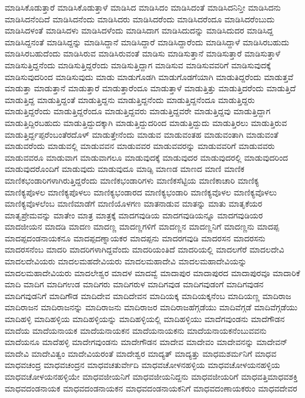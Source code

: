 {ಮಾಡಿಸಿಕೊಡುತ್ತಾರೆ
ಮಾಡಿಸಿಕೊಡುತ್ತಾಳೆ
ಮಾಡಿಸಿದ
ಮಾಡಿಸಿದಂ
ಮಾಡಿಸಿದಂತೆ
ಮಾಡಿಸಿದನಿನ್ತೀ
ಮಾಡಿಸಿದನು
ಮಾಡಿಸಿದನೆಂದಿದೆ
ಮಾಡಿಸಿದನೆಂದು
ಮಾಡಿಸಿದರು
ಮಾಡಿಸಿದರೆಂದು
ಮಾಡಿಸಿದರೆಂದೂ
ಮಾಡಿಸಿದರೆಂಬುದು
ಮಾಡಿಸಿದಳಂತೆ
ಮಾಡಿಸಿದಳು
ಮಾಡಿಸಿದಳೆಂದು
ಮಾಡಿಸಿದಾಗ
ಮಾಡಿಸಿದುದನ್ನು
ಮಾಡಿಸಿದುದರ
ಮಾಡಿಸಿದ್ದ
ಮಾಡಿಸಿದ್ದನಂತೆ
ಮಾಡಿಸಿದ್ದನ್ನು
ಮಾಡಿಸಿದ್ದಾನೆ
ಮಾಡಿಸಿದ್ದಾರೆ
ಮಾಡಿಸಿದ್ದಾರೆಂದು
ಮಾಡಿಸಿದ್ದಾಳೆ
ಮಾಡಿಸಿರಬಹುದು
ಮಾಡಿಸಿರಬಹುದೆಂದು
ಮಾಡಿಸಿರುವ
ಮಾಡಿಸಿರುವಂತೆ
ಮಾಡಿಸು
ಮಾಡಿಸುತ್ತಾನೆ
ಮಾಡಿಸುತ್ತಾರೆ
ಮಾಡಿಸುತ್ತಾಳೆ
ಮಾಡಿಸುತ್ತಿದ್ದನೆಂದು
ಮಾಡಿಸುತ್ತಿದ್ದರೆಂದು
ಮಾಡಿಸುತ್ತಿದ್ದಾಗ
ಮಾಡಿಸುವ
ಮಾಡಿಸುವವರಿಗೆ
ಮಾಡಿಸುವುದಕ್ಕೆ
ಮಾಡಿಸುವುದರಿಂದ
ಮಾಡಿಸುವುದು
ಮಾಡು
ಮಾಡುಗೊಡಗಿ
ಮಾಡುಗೊಡಗೆಯಾಗಿ
ಮಾಡುತಿದ್ದರೆಂದು
ಮಾಡುತ್ತವೆ
ಮಾಡುತ್ತಾ
ಮಾಡುತ್ತಾನೆ
ಮಾಡುತ್ತಾರೆ
ಮಾಡುತ್ತಾರೆಂದೂ
ಮಾಡುತ್ತಾಳೆ
ಮಾಡುತ್ತಿತ್ತು
ಮಾಡುತ್ತಿದರೆಂದು
ಮಾಡುತ್ತಿದೆ
ಮಾಡುತ್ತಿದ್ದ
ಮಾಡುತ್ತಿದ್ದಂತೆ
ಮಾಡುತ್ತಿದ್ದನು
ಮಾಡುತ್ತಿದ್ದನೆಂದು
ಮಾಡುತ್ತಿದ್ದನೆಂದೂ
ಮಾಡುತ್ತಿದ್ದರು
ಮಾಡುತ್ತಿದ್ದರೆಂದು
ಮಾಡುತ್ತಿದ್ದರೆಂದೂ
ಮಾಡುತ್ತಿದ್ದವರು
ಮಾಡುತ್ತಿದ್ದವರೇ
ಮಾಡುತ್ತಿದ್ದವು
ಮಾಡುತ್ತಿದ್ದಾಗ
ಮಾಡುತ್ತಿದ್ದಿರಬಹುದು
ಮಾಡುತ್ತಿದ್ದುದಕ್ಕಾಗಿ
ಮಾಡುತ್ತಿದ್ದುದರಿಂದ
ಮಾಡುತ್ತಿದ್ದುದು
ಮಾಡುತ್ತಿರಲು
ಮಾಡುತ್ತಿರುವ
ಮಾಡುತ್ತಿರ್ದ್ದಪ್ಪರೆಂಬಂತೆರದೊಳ್
ಮಾಡುತ್ತೇನೆಂದು
ಮಾಡುವ
ಮಾಡುವಂತಹ
ಮಾಡುವಂತಾಗಿ
ಮಾಡುವಂತೆ
ಮಾಡುವರೆಂದು
ಮಾಡುವಲ್ಲಿ
ಮಾಡುವವನ
ಮಾಡುವವರ
ಮಾಡುವವರನ್ನು
ಮಾಡುವವರಿಗೆ
ಮಾಡುವವರು
ಮಾಡುವವರೂ
ಮಾಡುವಾಗ
ಮಾಡುವಾಗಲೂ
ಮಾಡುವುದಕ್ಕೆ
ಮಾಡುವುದರ
ಮಾಡುವುದರಲ್ಲಿ
ಮಾಡುವುದರಿಂದ
ಮಾಡುವುದರೊಂದಿಗೆ
ಮಾಡುವುದು
ಮಾಡುವುದೂ
ಮಾಡ್ಸಿ
ಮಾಣಡ
ಮಾಣದ
ಮಾಣಿ
ಮಾಣಿಕ
ಮಾಣಿಕಭಂಡಾರಿಗಳಾಗಿರುತ್ತಿದ್ದರೆಂದು
ಮಾಣಿಕಭಂಡಾರಿಗಳು
ಮಾಣಿಕಸೆಟ್ಟಿಯ
ಮಾಣಿಕಾಚಾರಿ
ಮಾಣಿಕ್ಯ
ಮಾಣಿಕ್ಯಪೊಳಲ
ಮಾಣಿಕ್ಯಪೊಳಲು
ಮಾಣಿಕ್ಯಭಂಡಾರದ
ಮಾಣಿಕ್ಯಭಂಡಾರಿ
ಮಾಣಿಕ್ಯವೊಳಲ
ಮಾಣಿಕ್ಯವೊಳಲು
ಮಾಣಿಕ್ಯವೊಳಲೆಂಬ
ಮಾಣಿಮಾಡೆಗೆ
ಮಾಣಿಯೊಳಗಣ
ಮಾತನಾಡುವ
ಮಾತನ್ನು
ಮಾತು
ಮಾತೃಕೆಯರ
ಮಾತೃಪ್ರೇಮವನ್ನು
ಮಾತೇಂ
ಮಾತ್ರ
ಮಾತ್ರಕ್ಕೆ
ಮಾದಗವುಡಿಯ
ಮಾದಗವುಡಿಯನ್ನೂ
ಮಾದಗವುಡಿಯರ
ಮಾದಜೀಯನ
ಮಾದಡಿ
ಮಾದಣ
ಮಾದಣ್ಣ
ಮಾದಣ್ಣಗಳಿಗೆ
ಮಾದಣ್ಣನ
ಮಾದಣ್ಣನಿಗೆ
ಮಾದಣ್ಣನು
ಮಾದಪ್ಪ
ಮಾದಪ್ಪದಂಡನಾಯಕನೂ
ಮಾದಪ್ಪದಣ್ನಾಯಕರ
ಮಾದಪ್ಪನು
ಮಾದರಗವುಡಿ
ಮಾದರಸನ
ಮಾದರಸನು
ಮಾದರಸನೆಂಬ
ಮಾದರಿ
ಮಾದರಿಗಳಾಗಿದ್ದವೆಂದು
ಮಾದರಿಯಂತಿದೆ
ಮಾದರಿಯಲ್ಲಿ
ಮಾದಲಗೆರೆ
ಮಾದಲದೇವಿ
ಮಾದಲದೇವಿಯರು
ಮಾದಲಮಹದೇವಿಯರು
ಮಾದಲಮಹಾದೇವಿ
ಮಾದಲಮಹಾದೇವಿಯನ್ನು
ಮಾದಲಮಹಾದೇವಿಯರು
ಮಾದಲೇಶ್ವರ
ಮಾದಳ
ಮಾದವ್ವೆ
ಮಾದಾಪುರ
ಮಾದಾಪುರದ
ಮಾದಾಪುರವೂ
ಮಾದಾರಿಕೆ
ಮಾದಿ
ಮಾದಿಗ
ಮಾದಿಗಉಡ
ಮಾದಿಗರು
ಮಾದಿಗರುಳ
ಮಾದಿಗವುಡ
ಮಾದಿಗವುಡಂಗೆ
ಮಾದಿಗವುಡನ
ಮಾದಿಗವುಡನಿಗೆ
ಮಾದಿಗೌಡ
ಮಾದಿದೇವ
ಮಾದಿದೇವನ
ಮಾದಿಯಕ್ಕ
ಮಾದಿಯಕ್ಕನೆಂಬ
ಮಾದಿಯಣ್ಣ
ಮಾದಿರಾಜ
ಮಾದಿರಾಜನ
ಮಾದಿರಾಜನನ್ನು
ಮಾದಿರಾಜನು
ಮಾದಿರಾಜರ
ಮಾದಿರಾಜಹೆಗ್ಗಡೆಯು
ಮಾದಿವೆಗ್ಗಡೆ
ಮಾದಿವೆಗ್ಗಡೆಯು
ಮಾದಿಹಳ್ಳಿ
ಮಾದಿಹಳ್ಳಿಯ
ಮಾದಿಹಳ್ಳಿಯನ್ನು
ಮಾದಿಹಳ್ಳಿಯಲ್ಲಿ
ಮಾದಿಹಳ್ಳಿಯು
ಮಾದೆಗವುಂಡನು
ಮಾದೆಗೌಡನ
ಮಾದೆಯ
ಮಾದೆಯನಾಯಕ
ಮಾದೆಯನಾಯಕನ
ಮಾದೆಯನಾಯಕನು
ಮಾದೆಯನಾಯಕನೆಂಬುವವನು
ಮಾದೆಯನೂ
ಮಾದೆಹಳ್ಳಿ
ಮಾದೇಗವುಂಡನು
ಮಾದೇಗೌಡನ
ಮಾದೇವ
ಮಾದೇವಂ
ಮಾದೇವನನ್ನು
ಮಾದೇವನ್
ಮಾದೇವಿ
ಮಾದೇವಿತ್ವಂ
ಮಾದೇವಿಯರಂತೆ
ಮಾದೇಶ್ವರ
ಮಾದ್ಯತ್
ಮಾದ್ಯತ್ತು
ಮಾಧಮಶರ್ಮನಿಗೆ
ಮಾಧವ
ಮಾಧವಚಂದ್ರ
ಮಾಧವಚಂದ್ರನ
ಮಾಧವಚತುರ್ವೇದಿ
ಮಾಧವಚೋಳನಹಳ್ಳಿಯ
ಮಾಧವಚೋಳಯನಹಳ್ಳಿಯ
ಮಾಧವಚೋಳಯನಹಳ್ಳಿಯೇ
ಮಾಧವಜೀಯನಿಗೆ
ಮಾಧವಜೀಯನಿದ್ದನು
ಮಾಧವಜೀಯರಿಗೆ
ಮಾಧವತ್ತಿಮಾಧವಶಕ್ತಿ
ಮಾಧವದಂಡನಾಯಕ
ಮಾಧವದಂಡನಾಯಕನ
ಮಾಧವದಂಡನಾಯಕನಿಗೆ
ಮಾಧವದಂಣಾಯಕರುಂ
ಮಾಧವದೇವರ
}
